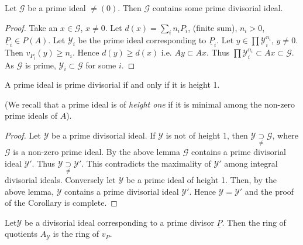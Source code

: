 \setcounter{lemma}{2}
\begin{lemma}%
Let $\mathscr{G} $ be a prime ideal $\neq (0)$. Then $\mathscr{G}$
contains some prime divisorial ideal. 
\end{lemma}  
  
\begin{proof}
Take an $x \in \mathscr{G}$, $x \neq 0$. Let $d(x) = \sum\limits_i n_i
P_i$, (finite sum), $n_i > 0$, $\underline{P}_i \in P(A)$. Let
$\mathscr{Y}_i$ be the prime ideal corresponding to
$\underline{P}_i$. Let $y \in \prod \mathscr{Y}^{n_i}_{i}$, $y \neq
0$. Then $v_{P_i} (y) \ge n_i$. Hence $d(y) \ge d(x)$ i.e. $Ay \subset
Ax$. Thus $\prod \mathscr{Y}^{n_i}_i \subset Ax \subset
\mathscr{G}$. As $\mathscr{G}$ is prime, $\mathscr{Y}_i \subset
\mathscr{G}$ for some $i$. 
\end{proof}  
  
\begin{coro*} %
A prime ideal is prime divisorial if and only if it is height 1.
\end{coro*}  
   
(We recall that a prime ideal is of \textit{height one} if it is
minimal among the non-zero prime ideals of $A$). 
  
\begin{proof}
Let $\mathscr{Y}$ be a prime divisorial ideal. If $\mathscr{Y}$ is not
of height 1, then $\mathscr{Y} \underset{\neq}{\supset}
\mathscr{G}$, where $\mathscr{G}$ is a non-zero prime ideal. By the
above lemma $\mathscr{G}$ contains a prime divisorial ideal
$\mathscr{Y}'$. Thus $\mathscr{Y} \underset{\neq}{\supset}
\mathscr{Y}'$. This contradicts the maximality of $\mathscr{Y}'$ among
integral divisorial ideals. Conversely let $\mathscr{Y}$ be a prime
ideal of height 1. Then, by the above lemma, $\mathscr{Y}$ contains
a prime divisorial ideal $\mathscr{Y}'$. Hence $\mathscr{Y } =
\mathscr{Y}'$ and the proof of the Corollary is complete. 
\end{proof}  
  
\begin{lemma} %
 Let\pageoriginale $\mathscr{Y}$ be a divisorial ideal corresponding
 to a prime divisor $\underline{P}$. Then the ring of quotients
 $A_\mathscr{Y}$ is the ring of $v_{\underline{P}}$.  
\end{lemma}  
  
